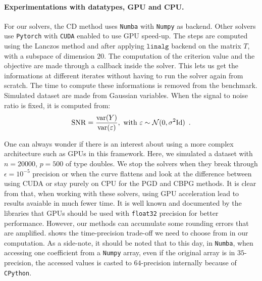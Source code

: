 \documentclass[a4]{article}
\begin{document}
\paragraph{Experimentations with datatypes, GPU and CPU.}

For our solvers, the CD method uses \texttt{Numba} with \texttt{Numpy} as backend. Other solvers use \texttt{Pytorch} with \texttt{CUDA} enabled to use GPU speed-up.
The steps are computed using the Lanczos method and after applying $\texttt{linalg}$ backend on the matrix $T$, with a subspace of dimension $20$.
The computation of the criterion value and the objective are made through a callback inside the solver. This lets us get the informations at
different iterates without having to run the solver again from scratch. The time to compute these informations is removed from the benchmark.
Simulated dataset are made from Gaussian variables. When the signal to noise ratio is fixed, it is computed from:
\[\mathrm{SNR} = \frac{\operatorname{var}(Y)}{\operatorname{var}(\varepsilon)}, \text{ with }\varepsilon \sim \mathcal{N}(0, \sigma^2\mathrm{Id})\enspace.\]

\medskip

One can always wonder if there is an interest about using a more complex architecture such as GPUs in this framework. Here, we simulated a dataset
with $n=20000$, $p=500$ of type doubles. We stop the solvers when they break through $\epsilon=10^{-5}$ precision or when the curve flattens and look at the difference between using CUDA or
stay purely on CPU for the PGD and CBPG methods.
It is clear from  that, when working with these solvers, using GPU acceleration lead to results avaiable in much fewer time.
It is well known and documented by the libraries \citep{torch} that GPUs should be used with \texttt{float32} precision for better performance.
However, our methods can accumulate some rounding errors that are amplified.  shows the time-precision trade-off we need to choose from in our computation.
As a side-note, it should be noted that to this day, in \texttt{Numba}, when accessing one coefficient from a \texttt{Numpy} array, even if the original array is in $35$-precision, the accessed values is casted to $64$-precision internally because of \texttt{CPython}.
\end{document}
